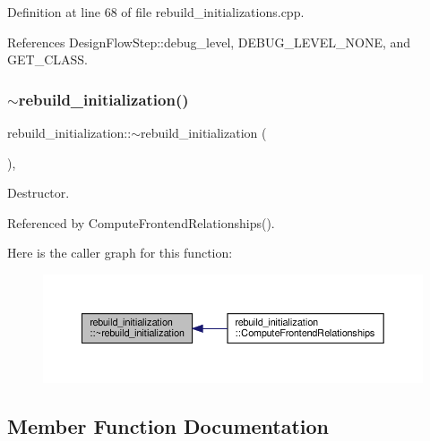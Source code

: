 Definition at line 68 of file rebuild\+\_\+initializations.\+cpp.



References Design\+Flow\+Step\+::debug\+\_\+level, D\+E\+B\+U\+G\+\_\+\+L\+E\+V\+E\+L\+\_\+\+N\+O\+NE, and G\+E\+T\+\_\+\+C\+L\+A\+SS.

\mbox{\label{classrebuild__initialization_a026135e1c23ed5b77cf93fe574648086}} 
\subsubsection{\texorpdfstring{$\sim$rebuild\+\_\+initialization()}{~rebuild\_initialization()}}
{\footnotesize\ttfamily rebuild\+\_\+initialization\+::$\sim$rebuild\+\_\+initialization (\begin{DoxyParamCaption}{ }\end{DoxyParamCaption})\hspace{0.3cm}{\ttfamily [override]}, {\ttfamily [default]}}



Destructor. 



Referenced by Compute\+Frontend\+Relationships().

Here is the caller graph for this function\+:
\nopagebreak
\begin{figure}[H]
\begin{center}
\leavevmode
\includegraphics[width=350pt]{de/d85/classrebuild__initialization_a026135e1c23ed5b77cf93fe574648086_icgraph}
\end{center}
\end{figure}


\subsection{Member Function Documentation}
\mbox{\label{classrebuild__initialization_a829e690735887f26f8fb2067fe1abf1f}} 
